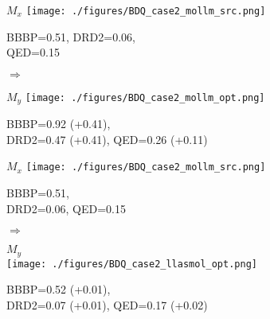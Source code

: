 \begin{figure}[htbp]
    \centering
    \begin{minipage}{0.43\linewidth}
        \centering
        \tiny $M_x$
        \texttt{[image: ./figures/BDQ\_case2\_mollm\_src.png]}
        \par\vspace{2pt}
        \tiny BBBP=0.51, DRD2=0.06, \\
        \tiny QED=0.15
    \end{minipage}
    \hfill
    \begin{minipage}{0.1\linewidth}
        \centering \Large$\Rightarrow$\\
        \raggedright \tiny \mollm
        \raggedright \tiny {}
    \end{minipage}
    \hfill
    \begin{minipage}{0.44\linewidth}
        \centering
        \tiny $M_y$
        \texttt{[image: ./figures/BDQ\_case2\_mollm\_opt.png]}
        \par\vspace{2pt}
        \tiny BBBP=0.92 (+0.41),\\ 
        \tiny DRD2=0.47 (+0.41), QED=0.26 (+0.11)
    \end{minipage}

    \vspace{1em}

    \begin{minipage}{0.43\linewidth}
        \centering
        \tiny $M_x$
        \texttt{[image: ./figures/BDQ\_case2\_mollm\_src.png]}
        \par\vspace{2pt}
        \tiny BBBP=0.51, \\
        \tiny DRD2=0.06, QED=0.15
    \end{minipage}
    \hfill
    \begin{minipage}{0.1\linewidth}
        \centering \Large$\Rightarrow$\\
        \raggedright \tiny \LlaSMol
        \raggedright \tiny {}
    \end{minipage}
    \hfill
    \begin{minipage}{0.44\linewidth}
        \centering
        \tiny $M_y$\\
        \texttt{[image: ./figures/BDQ\_case2\_llasmol\_opt.png]}
        \par\vspace{1pt}
        \tiny BBBP=0.52 (+0.01), \\ 
        \tiny DRD2=0.07 (+0.01), QED=0.17 (+0.02)
    \end{minipage}
\end{figure}
